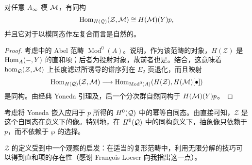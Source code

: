 \begin{lemma}\label{st:4.5}
对任意 $A_\infty$ 模 $\mathcal M$，有同构
\[
\operatorname{Hom}_{H(\mathcal Q)}(\mathcal Z,\mathcal M)\cong H(\mathcal M)(Y)p,
\]
并且它对于以模同态作左复合而言是自然的。
\end{lemma}
\begin{proof}
考虑中的 Abel 范畴 $\operatorname{Mod}^0(A)$。说明，作为该范畴的对象，$H(\mathcal Z)$ 是 $\operatorname{Hom}_A(-,Y)$ 的直和项；后者为投射对象，故前者也是。结合，这意味着 $\hom_{\mathcal Q}(\mathcal Z,\mathcal M)$ 上长度滤过所诱导的谱序列在 $E_2$ 页退化，而且映射
\[
\operatorname{Hom}_{H(\mathcal Q)}(\mathcal Z,\mathcal M)\longrightarrow\operatorname{Hom}_{\operatorname{Mod}^0(A)}(H(\mathcal Z),H(\mathcal M)[\bullet])
\]
是同构。由经典 Yoneda 引理及，后一个分次群自然同构于 $H(\mathcal M)(Y)p$。
\end{proof}
考虑将 Yoneda 嵌入应用于 $p$ 所得的 $H^0(\mathcal Q)$ 中的幂等自同态。由直接可知，$\mathcal Z$ 是这个自同态在意义下的像。特别地，在 $H^0(\mathcal Q)$ 中的同构意义下，抽象像只依赖于 $p$，而不依赖于 $\wp$ 的选择。
\begin{note}\label{st:4.6}
$\mathcal Z$ 的定义受到中一个观察的启发：在适当的复形范畴中，利用无限分解的技巧可以得到直和项的存在性（感谢 François Loeser 向我指出这一点）。
\end{note}


